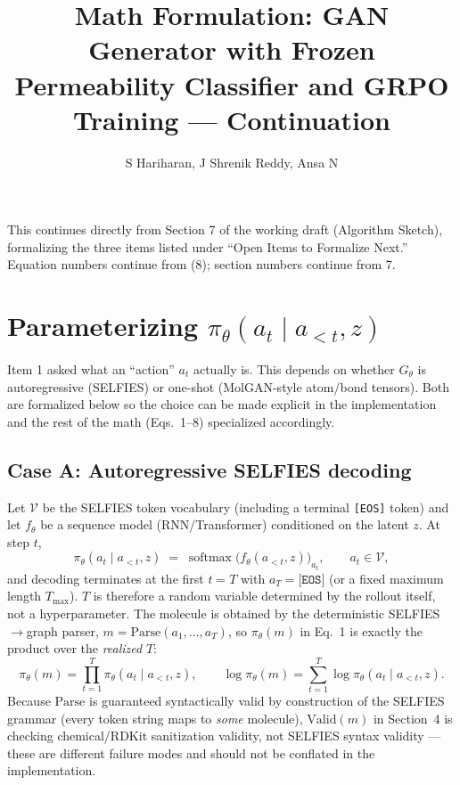 \documentclass[11pt]{article}
\title{Math Formulation: GAN Generator with Frozen Permeability
Classifier and GRPO Training --- Continuation}
\author{S Hariharan, J Shrenik Reddy, Ansa N}
\date{}
\newcommand{\1}{\mathbb{1}}
\begin{document}
\maketitle

\noindent This continues directly from Section 7 of the working draft
(Algorithm Sketch), formalizing the three items listed under
``Open Items to Formalize Next.'' Equation numbers continue from
(8); section numbers continue from 7.

\section{Parameterizing $\pi_\theta(a_t \mid a_{<t}, z)$}
\label{sec:action-param}

Item 1 asked what an ``action'' $a_t$ actually is. This depends on
whether $G_\theta$ is autoregressive (SELFIES) or one-shot
(MolGAN-style atom/bond tensors). Both are formalized below so the
choice can be made explicit in the implementation and the rest of
the math (Eqs.\ 1--8) specialized accordingly.

\subsection{Case A: Autoregressive SELFIES decoding}

Let $\mathcal{V}$ be the SELFIES token vocabulary (including a
terminal \texttt{[EOS]} token) and let $f_\theta$ be a sequence model
(RNN/Transformer) conditioned on the latent $z$. At step $t$,
\begin{equation}
\pi_\theta(a_t \mid a_{<t}, z) \;=\; \operatorname{softmax}\!\big(f_\theta(a_{<t}, z)\big)_{a_t},
\qquad a_t \in \mathcal{V},
\label{eq:selfies-step}
\end{equation}
and decoding terminates at the first $t = T$ with $a_T = \texttt{[EOS]}$
(or a fixed maximum length $T_{\max}$). $T$ is therefore a random
variable determined by the rollout itself, not a hyperparameter.
The molecule is obtained by the deterministic SELFIES$\to$graph
parser, $m = \mathrm{Parse}(a_1,\dots,a_T)$, so $\pi_\theta(m)$ in
Eq.~1 is exactly the product over the \emph{realized} $T$:
\begin{equation}
\pi_\theta(m) = \prod_{t=1}^{T} \pi_\theta(a_t \mid a_{<t}, z), \qquad
\log \pi_\theta(m) = \sum_{t=1}^{T} \log \pi_\theta(a_t \mid a_{<t}, z).
\label{eq:selfies-logprob}
\end{equation}
Because $\mathrm{Parse}$ is guaranteed syntactically valid by
construction of the SELFIES grammar (every token string maps to
\emph{some} molecule), $\mathrm{Valid}(m)$ in Section~4 is checking
chemical/RDKit sanitization validity, not SELFIES syntax validity ---
these are different failure modes and should not be conflated in the
implementation.
\end{document}
